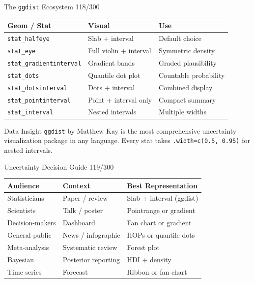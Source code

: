 \documentclass[10pt]{beamer}
\newcommand{\smark}[1]{\hfill{\scriptsize\color{codegray}#1}}
\begin{document}
\begin{frame}{The \texttt{ggdist} Ecosystem}
\smark{118/300}
\centering\small
\begin{tabular}{@{}lll@{}}
    \toprule
    \textbf{Geom / Stat} & \textbf{Visual} & \textbf{Use} \\
    \midrule
    \texttt{stat\_halfeye}         & Slab + interval          & Default choice \\
    \texttt{stat\_eye}             & Full violin + interval   & Symmetric density \\
    \texttt{stat\_gradientinterval}& Gradient bands           & Graded plausibility \\
    \texttt{stat\_dots}            & Quantile dot plot        & Countable probability \\
    \texttt{stat\_dotsinterval}    & Dots + interval          & Combined display \\
    \texttt{stat\_pointinterval}   & Point + interval only    & Compact summary \\
    \texttt{stat\_interval}        & Nested intervals         & Multiple widths \\
    \bottomrule
\end{tabular}

\vspace{0.3cm}
\begin{exampleblock}{Data Insight}
    \scriptsize \texttt{ggdist} by Matthew Kay is the most comprehensive uncertainty visualization package in any language. Every stat takes \texttt{.width=c(0.5, 0.95)} for nested intervals.
\end{exampleblock}
\end{frame}

\begin{frame}{Uncertainty Decision Guide}
\smark{119/300}
\centering\small
\begin{tabular}{@{}lll@{}}
    \toprule
    \textbf{Audience} & \textbf{Context} & \textbf{Best Representation} \\
    \midrule
    Statisticians        & Paper / review      & Slab + interval (ggdist) \\
    Scientists           & Talk / poster       & Pointrange or gradient \\
    Decision-makers      & Dashboard           & Fan chart or gradient \\
    General public       & News / infographic  & HOPs or quantile dots \\
    Meta-analysis        & Systematic review   & Forest plot \\
    Bayesian             & Posterior reporting  & HDI + density \\
    Time series          & Forecast            & Ribbon or fan chart \\
    \bottomrule
\end{tabular}
\end{frame}
\end{document}
